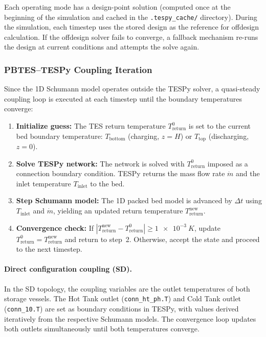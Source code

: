 \documentclass[11pt,review,3p]{elsarticle}
\begin{document}
Each operating mode has a design-point solution (computed once at the beginning of the simulation and cached in the \texttt{.tespy\_cache/} directory). During the simulation, each timestep uses the stored design as the reference for offdesign calculation. If the offdesign solver fails to converge, a fallback mechanism re-runs the design at current conditions and attempts the solve again.

\subsubsection{PBTES--TESPy Coupling Iteration}
\label{sec:pbtes_coupling}

Since the 1D Schumann model operates outside the TESPy solver, a quasi-steady coupling loop is executed at each timestep until the boundary temperatures converge:

\begin{enumerate}[leftmargin=*, itemsep=2pt]
    \item \textbf{Initialize guess:} The TES return temperature $T_{\text{return}}^{0}$ is set to the current bed boundary temperature: $T_{\text{bottom}}$ (charging, $z=H$) or $T_{\text{top}}$ (discharging, $z=0$).
    \item \textbf{Solve TESPy network:} The network is solved with $T_{\text{return}}^{0}$ imposed as a connection boundary condition. TESPy returns the mass flow rate $\dot{m}$ and the inlet temperature $T_{\text{inlet}}$ to the bed.
    \item \textbf{Step Schumann model:} The 1D packed bed model is advanced by $\Delta t$ using $T_{\text{inlet}}$ and $\dot{m}$, yielding an updated return temperature $T_{\text{return}}^{\text{new}}$.
    \item \textbf{Convergence check:} If $|T_{\text{return}}^{\text{new}} - T_{\text{return}}^{0}| \ge \SI{1e-3}{K}$, update $T_{\text{return}}^{0} = T_{\text{return}}^{\text{new}}$ and return to step~2. Otherwise, accept the state and proceed to the next timestep.
\end{enumerate}

\paragraph{Direct configuration coupling (SD).}
In the SD topology, the coupling variables are the outlet temperatures of both storage vessels. The Hot Tank outlet (\texttt{conn\_ht\_ph.T}) and Cold Tank outlet (\texttt{conn\_10.T}) are set as boundary conditions in TESPy, with values derived iteratively from the respective Schumann models. The convergence loop updates both outlets simultaneously until both temperatures converge.
\end{document}
